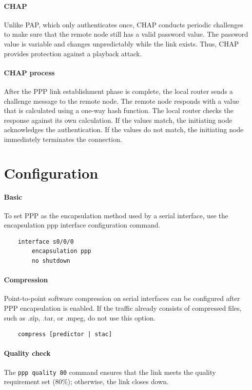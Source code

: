 \paragraph{CHAP}Unlike PAP, which only authenticates once, CHAP conducts periodic challenges to make sure that the remote node still has a valid password value. The password value is variable and changes unpredictably while the link exists. Thus, CHAP provides protection against a playback attack.\\

\paragraph{CHAP process}After the PPP link establishment phase is complete, the local router sends a challenge message to the remote node. The remote node responds with a value that is calculated using a one-way hash function. The local router checks the response against its own calculation. If the values match, the initiating node acknowledges the authentication. If the values do not match, the initiating node immediately terminates the connection.

\section{Configuration}

\paragraph{Basic} To set PPP as the encapsulation method used by a serial interface, use the encapsulation ppp interface configuration command.
	\begin{verbatim}
	interface s0/0/0
		encapsulation ppp
		no shutdown
	\end{verbatim}
	
\paragraph{Compression} Point-to-point software compression on serial interfaces can be configured after PPP encapsulation is enabled. If the traffic already consists of compressed files, such as .zip, .tar, or .mpeg, do not use this option.
	\begin{verbatim}
	compress [predictor | stac]	
	\end{verbatim}
	
\paragraph{Quality check} The \verb|ppp quality 80| command ensures that the link meets the quality requirement set (80\%); otherwise, the link closes down.

